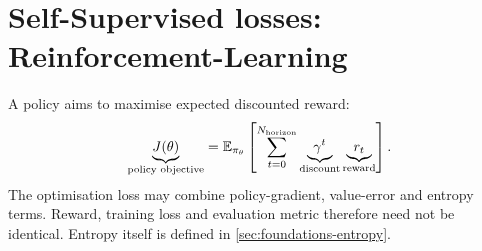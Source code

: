 \section{Self-Supervised losses: Reinforcement-Learning}
\label{sec:objectives-reinforcement-learning-objectives}
A policy aims to maximise expected discounted reward:
\[
    \underbrace{J(\theta)}_{\text{policy objective}}
    =
    \mathbb E_{\pi_\theta}
    \left[
    \sum_{t=0}^{N_{\text{horizon}}}
    \underbrace{\gamma^t}_{\text{discount}}
    \underbrace{r_t}_{\text{reward}}
    \right].
\]
The optimisation loss may combine policy-gradient, value-error and entropy terms.
Reward, training loss and evaluation metric therefore need not be identical.
Entropy itself is defined in \cref{sec:foundations-entropy}.